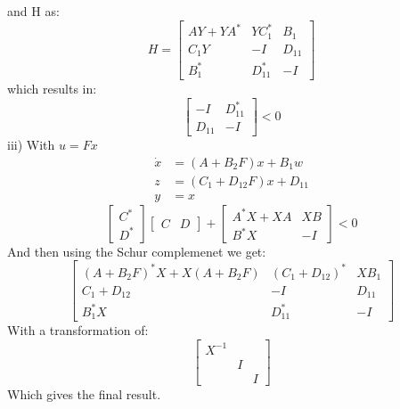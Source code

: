 \documentclass{article}
\begin{document}
and H as:
\begin{equation}
    H = \begin{bmatrix} AY + YA^* & YC_1^* & B_1 \\ C_1Y & -I & D_{11} \\ B_1^* & D_{11}^* & -I \end{bmatrix}
\end{equation}
which results in:
\begin{equation}
    \begin{bmatrix} -I & D_{11}^* \\ D_{11} & -I \end{bmatrix} < 0
\end{equation}
iii) With $u = Fx$
\begin{align*}
    \dot{x} &= (A + B_2F)x + B_1w \\
    z &= (C_1 + D_{12}F)x + D_{11} \\
    y &= x
\end{align*}
\begin{equation}
    \begin{bmatrix} C^* \\ D^* \end{bmatrix}\begin{bmatrix} C & D \end{bmatrix} + \begin{bmatrix} A^*X + XA & XB \\ B^*X & -I \end{bmatrix} < 0
\end{equation}
And then using the Schur complemenet we get:
\begin{equation}
    \begin{bmatrix}
        (A + B_2F)^*X + X(A + B_2F) & (C_1 + D_{12})^* & XB_1 \\
        C_1 + D_{12} & -I & D_{11} \\
        B_1^*X & D_{11}^* & -I
    \end{bmatrix}
\end{equation}
With a transformation of:
\begin{equation}
    \begin{bmatrix}
        X^{-1} & & \\
        & I & \\
        & & I
    \end{bmatrix}
\end{equation}
Which gives the final result.
\end{document}
